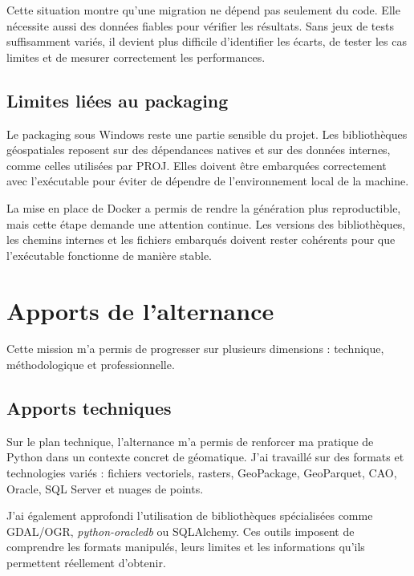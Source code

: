 Cette situation montre qu'une migration ne dépend pas seulement du code. Elle
nécessite aussi des données fiables pour vérifier les résultats. Sans jeux de
tests suffisamment variés, il devient plus difficile d'identifier les écarts, de
tester les cas limites et de mesurer correctement les performances.

\subsection{Limites liées au packaging}
\label{subsec:limites_packaging}

Le packaging sous Windows reste une partie sensible du projet. Les
bibliothèques géospatiales reposent sur des dépendances natives et sur des
données internes, comme celles utilisées par PROJ. Elles doivent être embarquées
correctement avec l'exécutable pour éviter de dépendre de l'environnement local
de la machine.

La mise en place de Docker a permis de rendre la génération plus reproductible,
mais cette étape demande une attention continue. Les versions des bibliothèques,
les chemins internes et les fichiers embarqués doivent rester cohérents pour que
l'exécutable fonctionne de manière stable.


\section{Apports de l'alternance}
\label{sec:apports_alternance}

Cette mission m'a permis de progresser sur plusieurs dimensions : technique,
méthodologique et professionnelle.

\subsection{Apports techniques}
\label{subsec:apports_techniques}

Sur le plan technique, l'alternance m'a permis de renforcer ma pratique de
Python dans un contexte concret de géomatique. J'ai travaillé sur des formats et
technologies variés : fichiers vectoriels, rasters, GeoPackage, GeoParquet,
CAO, Oracle, SQL Server et nuages de points.

J'ai également approfondi l'utilisation de bibliothèques spécialisées comme
GDAL/OGR, \textit{python-oracledb} ou SQLAlchemy. Ces outils imposent de
comprendre les formats manipulés, leurs limites et les informations qu'ils
permettent réellement d'obtenir.

